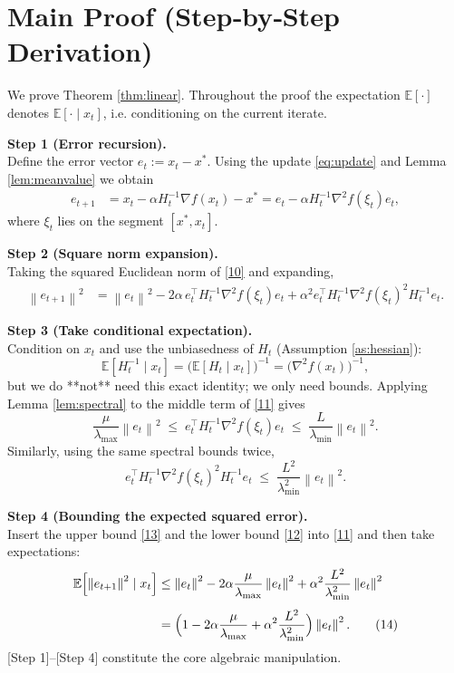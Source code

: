 \documentclass{article}
\newcommand{\E}{\mathbb{E}}
\newcommand{\norm}[1]{\left\|#1\right\|}
\begin{document}
\section*{Main Proof (Step‑by‑Step Derivation)}
We prove Theorem \ref{thm:linear}.  Throughout the proof the
expectation $\E[\cdot]$ denotes $\E[\cdot\mid x_t]$, i.e. conditioning on the
current iterate.

\noindent\textbf{Step 1 (Error recursion).}\\
Define the error vector $e_t:=x_t-x^{*}$.  Using the update \eqref{eq:update}
and Lemma \ref{lem:meanvalue} we obtain
\begin{align}
e_{t+1}
&=x_t-\alpha H_t^{-1}\nabla f(x_t)-x^{*}
   =e_t-\alpha H_t^{-1}\nabla^{2}f(\xi_t)e_t ,
\tag{10}
\end{align}
where $\xi_t$ lies on the segment $[x^{*},x_t]$.

\noindent\textbf{Step 2 (Square norm expansion).}\\
Taking the squared Euclidean norm of \eqref{10} and expanding,
\begin{align}
\norm{e_{t+1}}^{2}
&=\norm{e_t}^{2}
   -2\alpha\,e_t^{\!\top} H_t^{-1}\nabla^{2}f(\xi_t) e_t
   +\alpha^{2} e_t^{\!\top} H_t^{-1}\nabla^{2}f(\xi_t)^{2} H_t^{-1} e_t .
\tag{11}
\end{align}

\noindent\textbf{Step 3 (Take conditional expectation).}\\
Condition on $x_t$ and use the unbiasedness of $H_t$ (Assumption \ref{as:hessian}):
\[
\E[H_t^{-1}\mid x_t]=\bigl(\E[H_t\mid x_t]\bigr)^{-1}
   =\bigl(\nabla^{2}f(x_t)\bigr)^{-1},
\]
but we do **not** need this exact identity; we only need bounds.
Applying Lemma \ref{lem:spectral} to the middle term of \eqref{11} gives
\[
\frac{\mu}{\lambda_{\max}}\norm{e_t}^{2}
\;\le\;
e_t^{\!\top} H_t^{-1}\nabla^{2}f(\xi_t) e_t
\;\le\;
\frac{L}{\lambda_{\min}}\norm{e_t}^{2}.
\tag{12}
\]
Similarly, using the same spectral bounds twice,
\[
e_t^{\!\top} H_t^{-1}\nabla^{2}f(\xi_t)^{2} H_t^{-1} e_t
\;\le\;
\frac{L^{2}}{\lambda_{\min}^{2}}\norm{e_t}^{2}.
\tag{13}
\]

\noindent\textbf{Step 4 (Bounding the expected squared error).}\\
Insert the upper bound \eqref{13} and the lower bound \eqref{12} into
\eqref{11} and then take expectations:
\begin{align}
\E\!\left[\norm{e_{t+1}}^{2}\mid x_t\right]
&\le
\norm{e_t}^{2}
-2\alpha\frac{\mu}{\lambda_{\max}}\norm{e_t}^{2}
+\alpha^{2}\frac{L^{2}}{\lambda_{\min}^{2}}\norm{e_t}^{2}
\\[4pt]
&=
\Bigl(1-2\alpha\frac{\mu}{\lambda_{\max}}
      +\alpha^{2}\frac{L^{2}}{\lambda_{\min}^{2}}\Bigr)
   \norm{e_t}^{2}.
\tag{14}
\end{align}
[Step 1]–[Step 4] constitute the core algebraic manipulation.
\end{document}

